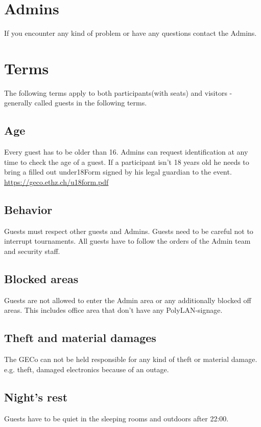 \documentclass{article}
\begin{document}
\section{Admins}
If you encounter any kind of problem or have any questions contact the Admins.

\section{Terms}
The following terms apply to both participants(with seats) and visitors - generally called guests in the following terms.

\subsection{Age}
Every guest has to be older than 16. Admins can request identification at any time to check the age of a guest.
If a participant isn't 18 years old he needs to bring a filled out under18Form signed by his legal guardian to the event. \url{https://geco.ethz.ch/u18form.pdf}

\subsection{Behavior}
Guests must respect other guests and Admins. Guests need to be careful not to interrupt tournaments. All guests have to follow the orders of the Admin team and security staff.

\subsection{Blocked areas}
Guests are not allowed to enter the Admin area or any additionally blocked off areas. This includes office area that don't have any PolyLAN-signage.

\subsection{Theft and material damages}
The GECo can not be held responsible for any kind of theft or material damage.\\ 
e.g. theft, damaged electronics because of an outage.

\subsection{Night's rest} 
Guests have to be quiet in the sleeping rooms and outdoors after 22:00.
\end{document}
